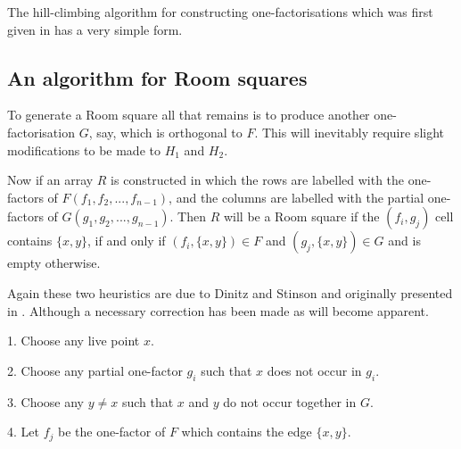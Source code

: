 \documentclass[11pt, a4paper]{book}\usepackage[]{graphicx}\usepackage[]{xcolor}
\begin{document}
The hill-climbing algorithm for constructing one-factorisations
which was first given in
\cite{dinitzHillClimbingAlgorithmConstruction1987}
has a very simple form.

\begin{algorithm}[H]
\end{algorithm}

\subsection{An algorithm for Room squares}

To generate a Room square all that remains is to produce
another one-factorisation $G$, say, which is orthogonal to
$F$. This will inevitably require slight modifications to
be made to $H_1$ and $H_2$.

Now if an array $R$ is constructed in which the rows are
labelled with the one-factors of $F(f_1,f_2,...,f_{n-1})$,
and the columns are labelled with the partial one-factors
of $G(g_1,g_2,...,g_{n-1})$. Then $R$ will be a Room square
if the $(f_i,g_j)$ cell contains $\{x,y\}$, if and only if
$(f_i,\{x,y\}) \in F$ and $(g_j,\{x,y\}) \in G$ and is empty
otherwise.

Again these two heuristics are due to Dinitz and Stinson and
originally presented in
\cite{dinitzHillClimbingAlgorithmConstruction1987}.
Although a necessary correction has been made as will
become apparent.

\begin{algorithm}[H]
  1. Choose any live point $x$.

  2. Choose any partial one-factor $g_i$ such that $x$ does
     not occur in $g_i$.

  3. Choose any $y \neq x$ such that $x$ and $y$ do not occur
     together in $G$.

  4. Let $f_j$ be the one-factor of $F$ which contains the 
     edge $\{x, y\}$.
     
\caption{$OH_1$}
\end{algorithm}
\end{document}

